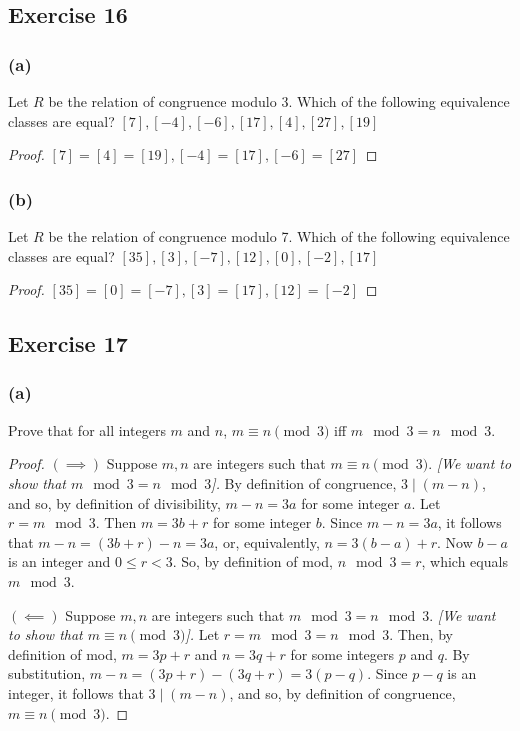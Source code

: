 \documentclass[14pt]{extarticle}
\begin{document}
\subsection{Exercise 16}
\subsubsection{(a)}
Let \(R\) be the relation of congruence modulo 3. Which of the following equivalence classes are equal?
\([7], [-4], [-6], [17], [4], [27], [19]\)

\begin{proof}
        \([7] = [4] = [19], [-4] = [17], [-6] = [27]\)
\end{proof}

\subsubsection{(b)}
Let \(R\) be the relation of congruence modulo 7. Which of the following equivalence classes are equal?
\([35], [3], [-7], [12], [0], [-2], [17]\)

\begin{proof}
        \([35] = [0] = [-7], [3] = [17], [12] = [-2]\)
\end{proof}

\subsection{Exercise 17}
\subsubsection{(a)}
Prove that for all integers $m$ and $n$, \(m \equiv n \pmod 3\) iff \(m \mod 3 = n \mod 3\).

\begin{proof}
        \(\bm{(\implies)}\) Suppose $m, n$ are integers such that \(m \equiv n \pmod 3\). {\it [We want to show that \(m \mod
                                3 = n \mod 3\)].} By definition of congruence, \(3 \mid (m-n)\), and so, by definition of divisibility, \(m - n = 3a\)
        for some integer $a$. Let \(r = m \mod 3\). Then \(m = 3b + r\) for some integer $b$. Since \(m - n = 3a\), it follows
        that \(m - n = (3b + r) - n = 3a\), or, equivalently, \(n = 3(b - a) + r\). Now \(b - a\) is an integer and \(0 \leq r
        < 3\). So, by definition of mod, \(n \mod 3 = r\), which equals \(m \mod 3\).

        \(\bm{(\impliedby)}\) Suppose $m, n$ are integers such that \(m \mod 3 = n \mod 3\). {\it [We want to show that \(m
                                \equiv n \pmod 3\)].} Let \(r = m \mod 3 = n \mod 3\). Then, by definition of mod, \(m = 3p + r\) and \(n = 3q +
        r\) for some integers $p$ and $q$. By substitution, \(m - n = (3p + r) - (3q + r) = 3(p - q)\). Since \(p - q\) is an
        integer, it follows that \(3 \mid (m - n)\), and so, by definition of congruence, \(m \equiv n \pmod 3\).
\end{proof}
\end{document}

